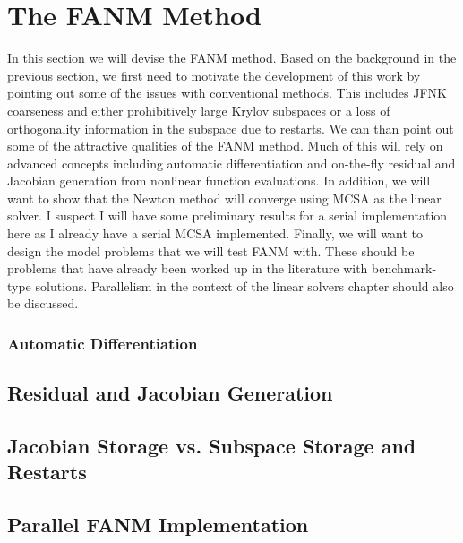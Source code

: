\section{The FANM Method}
\label{sec:fanm}
In this section we will devise the FANM method. Based on the
background in the previous section, we first need to motivate the
development of this work by pointing out some of the issues with
conventional methods. This includes JFNK coarseness and either
prohibitively large Krylov subspaces or a loss of orthogonality
information in the subspace due to restarts. We can than point out
some of the attractive qualities of the FANM method. Much of this will
rely on advanced concepts including automatic differentiation and
on-the-fly residual and Jacobian generation from nonlinear function
evaluations. In addition, we will want to show that the Newton method
will converge using MCSA as the linear solver. I suspect I will have
some preliminary results for a serial implementation here as I already
have a serial MCSA implemented. Finally, we will want to design the
model problems that we will test FANM with. These should be problems
that have already been worked up in the literature with benchmark-type
solutions. Parallelism in the context of the linear solvers chapter
should also be discussed.

\subsubsection{Automatic Differentiation}
\label{subsubsec:automatic_differentiation}

\subsection{Residual and Jacobian Generation}
\label{subsec:fanm_generation}

\subsection{Jacobian Storage vs. Subspace Storage and Restarts}
\label{subsec:fanm_storage}

\subsection{Parallel FANM Implementation}
\label{subsec:parallel_fanm}
